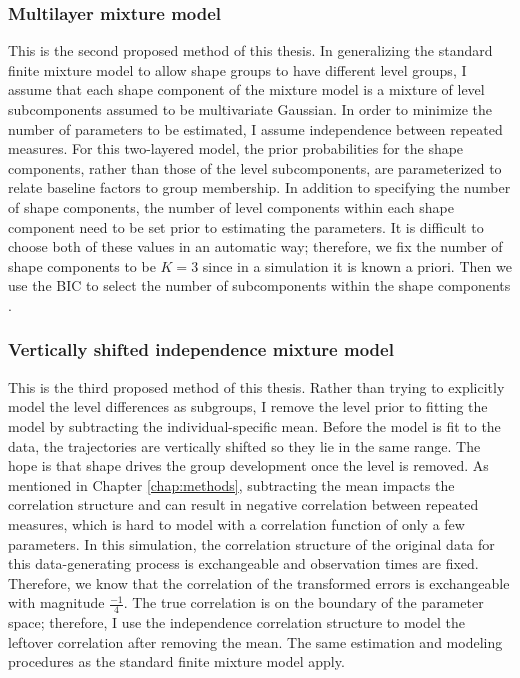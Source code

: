 \subsubsection{Multilayer mixture model}
This is the second proposed method of this thesis. In generalizing the standard finite mixture model to allow shape groups to have different level groups, I assume that each shape component of the mixture model is a mixture of level subcomponents assumed to be multivariate Gaussian. In order to minimize the number of parameters to be estimated, I assume independence between repeated measures. For this two-layered model, the prior probabilities for the shape components, rather than those of the level subcomponents, are parameterized to relate baseline factors to group membership. In addition to specifying the number of shape components, the number of level components within each shape component need to be set prior to estimating the parameters. It is difficult to choose both of these values in an automatic way; therefore, we fix the number of shape components to be $K=3$ since in a simulation it is known a priori. Then we use the BIC to select the number of subcomponents within the shape components \cite{li2005}. 

\subsubsection{Vertically shifted independence mixture model}
This is the third proposed method of this thesis. Rather than trying to explicitly model the level differences as subgroups, I remove the level prior to fitting the model by subtracting the individual-specific mean. Before the model is fit to the data, the trajectories are vertically shifted so they lie in the same range. The hope is that shape drives the group development once the level is removed. As mentioned in Chapter \ref{chap:methods}, subtracting the mean impacts the correlation structure and can result in negative correlation between repeated measures, which is hard to model with a correlation function of only a few parameters. In this simulation, the correlation structure of the original data for this data-generating process is exchangeable and observation times are fixed. Therefore, we know that the correlation of the transformed errors is exchangeable with magnitude $\frac{-1}{4}$. The true correlation is on the boundary of the parameter space; therefore, I use the independence correlation structure to model the leftover correlation after removing the mean. The same estimation and modeling procedures as the standard finite mixture model apply.

